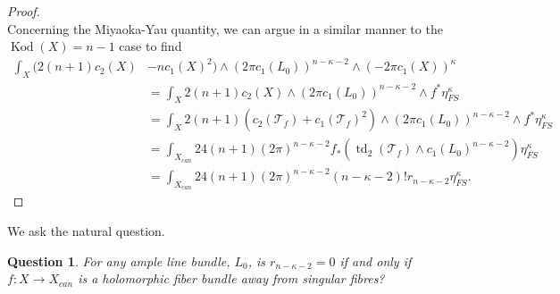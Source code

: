 \documentclass[12pt]{article}
\newtheorem{question}[theorem]{Question}
\numberwithin{equation}{section}
\newcommand{\T}{\mathcal{T}}
\DeclareMathOperator{\Kod}{Kod}
\DeclareMathOperator{\td}{td}
\begin{document}
\begin{proof}
\begin{equation*}
\end{equation*}
Concerning the Miyaoka-Yau quantity, we can argue in a similar manner to the $\Kod(X) = n-1$ case to find
\begin{align*}
    \int_X (2(n+1) c_2(X) &- n c_1(X)^{2} )\wedge (2 \pi c_1(L_0))^{n-\kappa - 2} \wedge (-2\pi c_1(X))^{\kappa}\\
    &= \int_X 2(n+1) c_2(X) \wedge (2 \pi c_1(L_0))^{n-\kappa-2} \wedge f^*\eta_{FS}^\kappa\\
    &= \int_X 2(n+1)( c_2(\T_f) + c_1(\T_f)^2) \wedge (2 \pi c_1(L_0))^{n-\kappa-2} \wedge f^*\eta_{FS}^\kappa\\
    &= \int_{X_{can}}  24 (n+1)(2\pi)^{n-\kappa-2} f_*\left(\td_2(\T_f) \wedge c_1(L_0)^{n-\kappa-2}\right) \eta_{FS}^\kappa\\
    &= \int_{X_{can}} 24 (n+1) (2\pi )^{n-\kappa-2}(n-\kappa-2)! r_{n-\kappa-2} \eta_{FS}^\kappa.
\end{align*}
\end{proof}

\noindent We ask the natural question.

\begin{question}
For any ample line bundle, $L_0$, is $r_{n-\kappa-2} = 0$ if and only if $f: X \to X_{can}$ is a holomorphic fiber bundle away from singular fibres?
\end{question}


\end{document}
